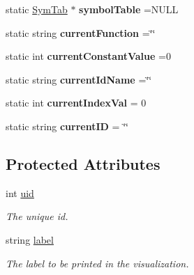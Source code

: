\begin{DoxyCompactItemize}
\item 
\hypertarget{classAST_a163003bfe9c30510ec8039870346049f}{static \hyperlink{classSymTab}{Sym\-Tab} $\ast$ {\bfseries symbol\-Table} =N\-U\-L\-L}\label{classAST_a163003bfe9c30510ec8039870346049f}

\item 
\hypertarget{classAST_a5c3cc894d9c0453523dec9ed76f18a04}{static string {\bfseries current\-Function} =\char`\"{}\char`\"{}}\label{classAST_a5c3cc894d9c0453523dec9ed76f18a04}

\item 
\hypertarget{classAST_a66155513b59ff1a04c8ece8b20ec31f5}{static int {\bfseries current\-Constant\-Value} =0}\label{classAST_a66155513b59ff1a04c8ece8b20ec31f5}

\item 
\hypertarget{classAST_a3d031d7bab635ba1f015aade5943f40c}{static string {\bfseries current\-Id\-Name} =\char`\"{}\char`\"{}}\label{classAST_a3d031d7bab635ba1f015aade5943f40c}

\item 
\hypertarget{classAST_a16c4b6e54febc1a26b31a64a46972ef0}{static int {\bfseries current\-Index\-Val} = 0}\label{classAST_a16c4b6e54febc1a26b31a64a46972ef0}

\item 
\hypertarget{classAST_a6fc65ae9dd064a88941d4b88669b19db}{static string {\bfseries current\-I\-D} = \char`\"{}\char`\"{}}\label{classAST_a6fc65ae9dd064a88941d4b88669b19db}

\end{DoxyCompactItemize}
\subsection*{Protected Attributes}
\begin{DoxyCompactItemize}
\item 
\hypertarget{classAST_a847b778f1c3dd5a19de32de432ee6e15}{int \hyperlink{classAST_a847b778f1c3dd5a19de32de432ee6e15}{uid}}\label{classAST_a847b778f1c3dd5a19de32de432ee6e15}

\begin{DoxyCompactList}\small\item\em The unique id. \end{DoxyCompactList}\item 
\hypertarget{classAST_ab2e239ccc0688d2341724432ff5a1a31}{string \hyperlink{classAST_ab2e239ccc0688d2341724432ff5a1a31}{label}}\label{classAST_ab2e239ccc0688d2341724432ff5a1a31}

\begin{DoxyCompactList}\small\item\em The label to be printed in the visualization. \end{DoxyCompactList}\end{DoxyCompactItemize}
